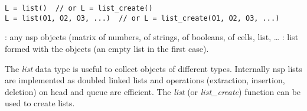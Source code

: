 
\begin{mandesc}
\end{mandesc}

\begin{calling_sequence}
\begin{verbatim}
L = list()  // or L = list_create()
L = list(O1, O2, O3, ...)  // or L = list_create(O1, O2, O3, ...) 
\end{verbatim}
\end{calling_sequence}
\begin{parameters}
  \begin{varlist}
    :  any nsp objects (matrix of numbers, of
    strings, of booleans, of cells, list, \ldots
    : list formed with the objects (an empty list in the
    first case).
  \end{varlist}
\end{parameters}

\begin{mandescription}
The \emph{list} data type is useful to collect objects of different
types. Internally nsp lists are implemented as doubled linked lists
and operations (extraction, insertion, deletion) on head and queue
are efficient. The \emph{list} (or \emph{list\_create}) function can 
be used to create lists.  
\end{mandescription}

